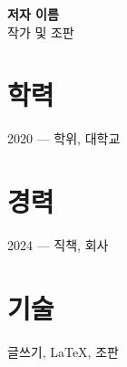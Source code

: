 \documentclass[11pt]{article}
\begin{document}
{\Large\bfseries 저자 이름}\\[4pt]
{\large 작가 및 조판}

\vspace{8pt}

\section*{학력}
2020 — 학위, 대학교

\section*{경력}
2024 — 직책, 회사

\section*{기술}
글쓰기, LaTeX, 조판
\end{document}
